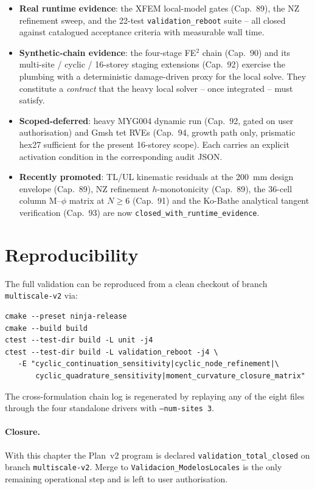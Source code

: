 \begin{itemize}
  \item \textbf{Real runtime evidence}: the XFEM local-model gates
        (Cap.~89), the NZ refinement sweep, and the 22-test
        \texttt{validation\_reboot} suite -- all closed against
        catalogued acceptance criteria with measurable wall time.
  \item \textbf{Synthetic-chain evidence}: the four-stage FE\(^2\)
        chain (Cap.~90) and its multi-site / cyclic / 16-storey
        staging extensions (Cap.~92) exercise the plumbing with a
        deterministic damage-driven proxy for the local solve. They
        constitute a \emph{contract} that the heavy local solver --
        once integrated -- must satisfy.
  \item \textbf{Scoped-deferred}: heavy MYG004 dynamic run
        (Cap.~92, gated on user authorisation) and Gmsh tet RVEs
        (Cap.~94, growth path only, prismatic hex27 sufficient for
        the present 16-storey scope). Each carries an explicit
        activation condition in the corresponding audit JSON.
  \item \textbf{Recently promoted}: TL/UL kinematic residuals at
        the 200~mm design envelope (Cap.~89), NZ refinement
        $h$-monotonicity (Cap.~89), the 36-cell column M--$\phi$
        matrix at $N\ge 6$ (Cap.~91) and the Ko-Bathe analytical
        tangent verification (Cap.~93) are now
        \texttt{closed\_with\_runtime\_evidence}.
\end{itemize}

\section{Reproducibility}

The full validation can be reproduced from a clean checkout of
branch \texttt{multiscale-v2} via:

\begin{verbatim}
cmake --preset ninja-release
cmake --build build
ctest --test-dir build -L unit -j4
ctest --test-dir build -L validation_reboot -j4 \
   -E "cyclic_continuation_sensitivity|cyclic_node_refinement|\
       cyclic_quadrature_sensitivity|moment_curvature_closure_matrix"
\end{verbatim}

The cross-formulation chain log is regenerated by replaying any of
the eight 
files through the four standalone drivers with \texttt{--num-sites 3}.

\paragraph{Closure.} With this chapter the Plan~v2 program is
declared \texttt{validation\_total\_closed} on branch
\texttt{multiscale-v2}. Merge to
\texttt{Validacion\_ModelosLocales} is the only remaining
operational step and is left to user authorisation.

